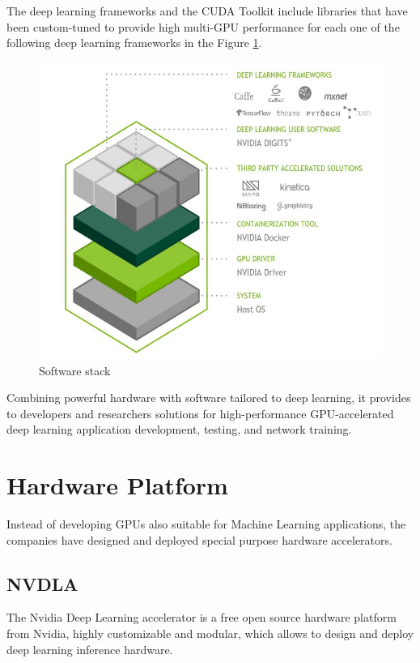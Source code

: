 \newpage
The deep learning frameworks and the CUDA Toolkit include libraries that have been custom-tuned to provide high multi-GPU performance for each one of the following deep learning frameworks in the Figure \ref{fig:swtesla}.

\begin{figure}[!htbp]
\centering
\captionsetup{justification=centering}
\includegraphics[scale=0.6]{./figure/sw_stack_tesla.PNG}
\caption{Software stack}
\label{fig:swtesla}
\end{figure}

Combining powerful hardware with software tailored to deep learning, it provides to developers and researchers solutions for high-performance GPU-accelerated deep learning application development, testing, and network training.
\newpage
\section{Hardware Platform}
Instead of developing GPUs also suitable for Machine Learning applications, the companies have designed and deployed special purpose hardware accelerators.
\subsection{NVDLA}
The Nvidia Deep Learning accelerator is a free open source hardware platform from Nvidia, highly customizable and modular, which allows to design and deploy deep learning inference hardware.

